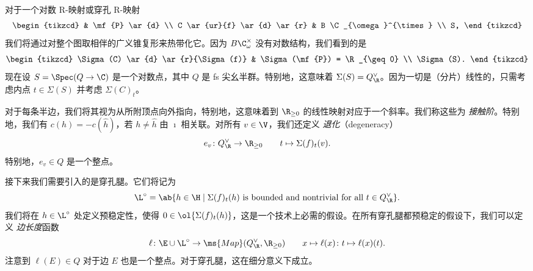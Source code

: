 \begin{exm}
\begin{center}
    \end{center}
\end{exm}

对于一个对数 R-映射或穿孔 R-映射
\begin{equation*}
\begin{tikzcd}
    & \mf{P} \ar{d} \\
    C \ar{ur}{f} \ar{d} \ar{r} & B \C_{\omega}^{\times} \\
    S,
\end{tikzcd}
\end{equation*}
我们将通过对整个图取相伴的广义锥复形来热带化它。因为 \(B \C_{\omega}^{\times}\) 没有对数结构，我们看到的是
\begin{equation*}
\begin{tikzcd}
    \Sigma(C) \ar{d} \ar{r}{\Sigma(f)} & \Sigma(\mf{P}) = \R_{\geq 0} \\
    \Sigma(S).
\end{tikzcd}
\end{equation*}
现在设 \(S = \Spec (Q \to \C)\) 是一个对数点，其中 \(Q\) 是 fs 尖幺半群。特别地，这意味着 \(\Sigma(S) = Q_{\R}^{\vee}\)。因为一切是（分片）线性的，只需考虑内点 \(t \in \Sigma(S)\) 并考虑 \(\Sigma(C)_t\)。

对于每条半边，我们将其视为从所附顶点向外指向，特别地，这意味着到 \(\R_{\geq 0}\) 的线性映射对应于一个斜率。我们称这些为 \textit{接触阶}。特别地，我们有 \(c(h) = - c(\hat{h})\)，若 \(h \neq \hat{h}\) 由 \(\imath\) 相关联。对所有 \(v \in \V\)，我们还定义 \textit{退化}（degeneracy）
\[ e_v \colon Q_{\R}^{\vee} \to \R_{\geq 0} \qquad t \mapsto \Sigma(f)_t (v). \]
特别地，\(e_v \in Q\) 是一个整点。

接下来我们需要引入的是穿孔腿。它们将记为
\[ \L^{\circ} = \ab\{ h \in \H \mid \Sigma(f)_t(h) \text{ is bounded and nontrivial for all } t \in Q_{\R}^{\vee}\}. \] 
我们将在 \(h \in \L^{\circ}\) 处定义预稳定性，使得 \(0 \in \ol{\Sigma(f)_t(h)}\)，这是一个技术上必需的假设。在所有穿孔腿都预稳定的假设下，我们可以定义 \textit{边长度}函数
\[ \ell \colon \E \cup \L^{\circ} \to \ms{Map}(Q_{\R}^{\vee}, \R_{\geq 0}) \qquad x \mapsto \ell(x) \colon t \mapsto \ell(x)(t). \]
注意到 \(\ell(E) \in Q\) 对于边 \(E\) 也是一个整点。对于穿孔腿，这在细分意义下成立。


